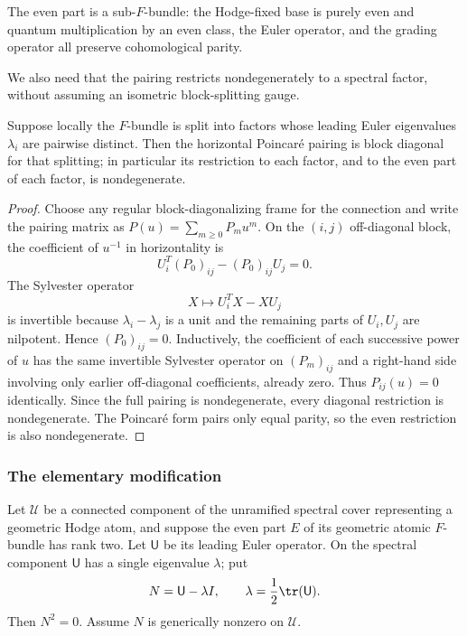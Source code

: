 The even part is a sub-$F$-bundle: the Hodge-fixed base is purely even and
quantum multiplication by an even class, the Euler operator, and the grading
operator all preserve cohomological parity.

We also need that the pairing restricts nondegenerately to a spectral factor,
without assuming an isometric block-splitting gauge.

\begin{lemma}\label{lem:orthogonal}
%
%
Suppose locally the $F$-bundle is split into factors whose leading Euler
eigenvalues $\lambda_i$ are pairwise distinct.  Then the horizontal Poincar\'e
pairing is block diagonal for that splitting; in particular its restriction
to each factor, and to the even part of each factor, is nondegenerate.
\end{lemma}

\begin{proof}
Choose any regular block-diagonalizing frame for the connection and write the
pairing matrix as $P(u)=\sum_{m\ge0}P_m u^m$.  On the $(i,j)$ off-diagonal
block, the coefficient of $u^{-1}$ in horizontality is
\[
  U_i^T(P_0)_{ij}-(P_0)_{ij}U_j=0.
\]
The Sylvester operator
\[
  X\longmapsto U_i^TX-XU_j
\]
is invertible because $\lambda_i-\lambda_j$ is a unit and the remaining parts of
$U_i,U_j$ are nilpotent.  Hence $(P_0)_{ij}=0$.  Inductively, the coefficient
of each successive power of $u$ has the same invertible Sylvester operator
on $(P_m)_{ij}$ and a right-hand side involving only earlier off-diagonal
coefficients, already zero.  Thus $P_{ij}(u)=0$ identically.  Since the full
pairing is nondegenerate, every diagonal restriction is nondegenerate.  The
Poincar\'e form pairs only equal parity, so the even restriction is also
nondegenerate.
%
\end{proof}

\subsubsection{The elementary modification}

Let $\mathcal U$ be a connected component of the unramified spectral cover
representing a geometric Hodge atom, and suppose the even part $E$ of its
geometric atomic $F$-bundle has rank two.  Let $\mathsf U$ be its leading
Euler operator.  On the spectral component $\mathsf U$ has a single
eigenvalue $\lambda$; put
\begin{equation}\label{eq:Ndef}
  N=\mathsf U-\lambda I,\qquad \lambda=\frac12\tr(\mathsf U).
\end{equation}
Then $N^2=0$.  Assume $N$ is generically nonzero on $\mathcal U$.

